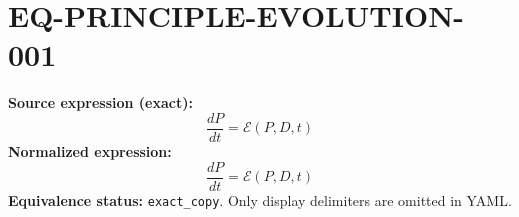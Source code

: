 \section*{EQ-PRINCIPLE-EVOLUTION-001}
\textbf{Source expression (exact):}
\[ \frac{dP}{dt} = \mathcal{E}(P,D,t) \]
\textbf{Normalized expression:}
\[ \frac{dP}{dt} = \mathcal{E}(P,D,t) \]
\textbf{Equivalence status:} \texttt{exact\_copy}. Only display delimiters are omitted in YAML.
